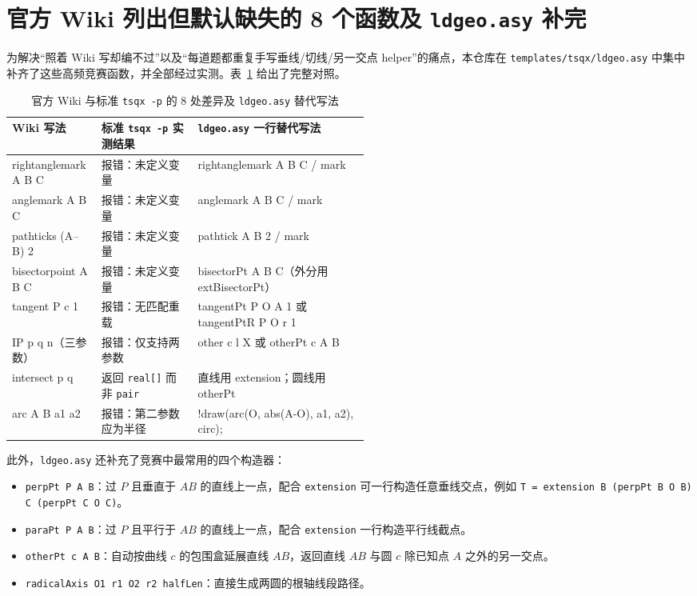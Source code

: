 \documentclass[11pt,oneside,fontset=none]{ctexbook}
\newcommand{\code}[1]{\texttt{#1}}
\begin{document}
\section{官方 Wiki 列出但默认缺失的 8 个函数及 \texttt{ldgeo.asy} 补完}

为解决“照着 Wiki 写却编不过”以及“每道题都重复手写垂线/切线/另一交点 helper”的痛点，本仓库在 \code{templates/tsqx/ldgeo.asy} 中集中补齐了这些高频竞赛函数，并全部经过实测。表~\ref{tab:wiki-diff} 给出了完整对照。

\begin{table}[htbp]
  \centering
  \caption{官方 Wiki 与标准 \texttt{tsqx -p} 的 8 处差异及 \texttt{ldgeo.asy} 替代写法}
  \label{tab:wiki-diff}
  \small
  \begin{tabularx}{\linewidth}{@{}>{\ttfamily}p{0.25\linewidth}p{0.27\linewidth}>{\ttfamily}X@{}}
    \toprule
    Wiki 写法 & 标准 \texttt{tsqx -p} 实测结果 & \texttt{ldgeo.asy} 一行替代写法 \\
    \midrule
    rightanglemark A B C & 报错：未定义变量 & rightanglemark A B C / mark \\
    anglemark A B C & 报错：未定义变量 & anglemark A B C / mark \\
    pathticks (A--B) 2 & 报错：未定义变量 & pathtick A B 2 / mark \\
    bisectorpoint A B C & 报错：未定义变量 & bisectorPt A B C（外分用 extBisectorPt） \\
    tangent P c 1 & 报错：无匹配重载 & tangentPt P O A 1 或 tangentPtR P O r 1 \\
    IP p q n（三参数） & 报错：仅支持两参数 & other c l X 或 otherPt c A B \\
    intersect p q & 返回 \code{real[]} 而非 \code{pair} & 直线用 extension；圆线用 otherPt \\
    arc A B a1 a2 & 报错：第二参数应为半径 & !draw(arc(O, abs(A-O), a1, a2), circ); \\
    \bottomrule
  \end{tabularx}
\end{table}

此外，\code{ldgeo.asy} 还补充了竞赛中最常用的四个构造器：
\begin{itemize}
  \item \code{perpPt P A B}：过 \(P\) 且垂直于 \(AB\) 的直线上一点，配合 \code{extension} 可一行构造任意垂线交点，例如 \code{T = extension B (perpPt B O B) C (perpPt C O C)}。
  \item \code{paraPt P A B}：过 \(P\) 且平行于 \(AB\) 的直线上一点，配合 \code{extension} 一行构造平行线截点。
  \item \code{otherPt c A B}：自动按曲线 \(c\) 的包围盒延展直线 \(AB\)，返回直线 \(AB\) 与圆 \(c\) 除已知点 \(A\) 之外的另一交点。
  \item \code{radicalAxis O1 r1 O2 r2 halfLen}：直接生成两圆的根轴线段路径。
\end{itemize}
\end{document}
